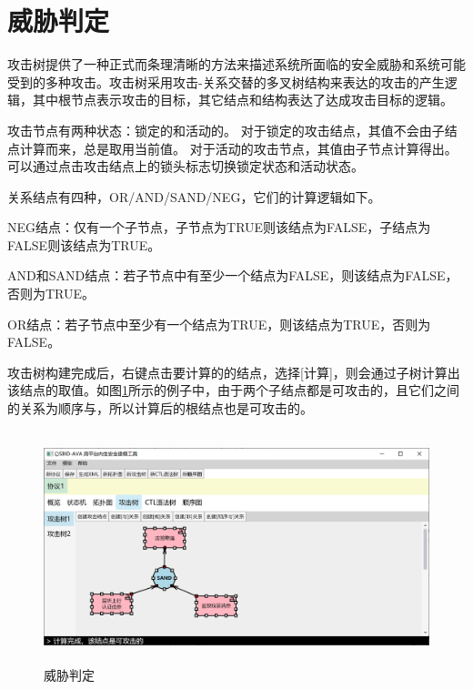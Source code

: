 \section{威胁判定}
攻击树提供了一种正式而条理清晰的方法来描述系统所面临的安全威胁和系统可能受到的多种攻击。攻击树采用攻击-关系交替的多叉树结构来表达的攻击的产生逻辑，其中根节点表示攻击的目标，其它结点和结构表达了达成攻击目标的逻辑。
\par
攻击节点有两种状态：锁定的和活动的。
对于锁定的攻击结点，其值不会由子结点计算而来，总是取用当前值。
对于活动的攻击节点，其值由子节点计算得出。
可以通过点击攻击结点上的锁头标志切换锁定状态和活动状态。
\par
关系结点有四种，OR/AND/SAND/NEG，它们的计算逻辑如下。
\par
NEG结点：仅有一个子节点，子节点为TRUE则该结点为FALSE，子结点为FALSE则该结点为TRUE。
\par
AND和SAND结点：若子节点中有至少一个结点为FALSE，则该结点为FALSE，否则为TRUE。
\par
OR结点：若子节点中至少有一个结点为TRUE，则该结点为TRUE，否则为FALSE。
\par
攻击树构建完成后，右键点击要计算的的结点，选择[计算]，则会通过子树计算出该结点的取值。如图\ref{attacktree_calculate}所示的例子中，由于两个子结点都是可攻击的，且它们之间的关系为顺序与，所以计算后的根结点也是可攻击的。
\begin{figure}[h]
	\centering
	\includegraphics[width=12cm,height=6.75cm]{imgs/attacktree_calculate.png}
	\caption{威胁判定}
	\label{attacktree_calculate}
\end{figure}